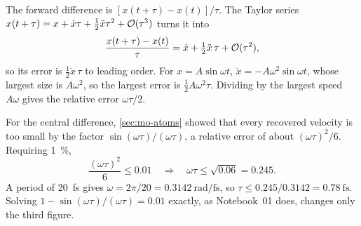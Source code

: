 The forward difference is $[x(t + \tau) -
x(t)]/\tau$. The Taylor series $x(t + \tau) = x + \dot{x}\tau + \tfrac12
\ddot{x}\tau^2 + \mathcal{O}(\tau^3)$ turns it into
\begin{equation*}
   \frac{x(t+\tau) - x(t)}{\tau} = \dot{x} + \tfrac12\ddot{x}\,\tau
   + \mathcal{O}(\tau^2) ,
\end{equation*}
so its error is $\tfrac12\ddot{x}\,\tau$ to leading order. For $x =
A\sin\omega t$, $\ddot{x} = -A\omega^2\sin\omega t$, whose largest size is
$A\omega^2$, so the largest error is $\tfrac12 A\omega^2\tau$. Dividing by
the largest speed $A\omega$ gives the relative error $\omega\tau/2$.

For the central difference, \cref{sec:mo-atoms} showed that every
recovered velocity is too small by the factor $\sin(\omega\tau)/
(\omega\tau)$, a relative error of about $(\omega\tau)^2/6$. Requiring
\SI{1}{\percent},
\begin{equation*}
   \frac{(\omega\tau)^2}{6} \le 0.01
   \quad\Longrightarrow\quad
   \omega\tau \le \sqrt{0.06} = 0.245 .
\end{equation*}
A period of \SI{20}{\femto\second} gives $\omega = 2\pi/20 =
\SI{0.3142}{\radian\per\femto\second}$, so $\tau \le 0.245/0.3142 =
\SI{0.78}{\femto\second}$. Solving $1 - \sin(\omega\tau)/(\omega\tau) =
0.01$ exactly, as Notebook~01 does, changes only the third figure.
